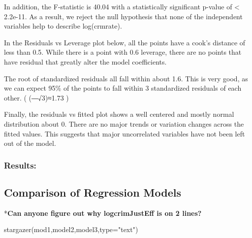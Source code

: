 \documentclass[]{article}
\newenvironment{Shaded}{}{}
\newcommand{\DataTypeTok}[1]{#1}
\newcommand{\KeywordTok}[1]{\textcolor[rgb]{0.00,0.00,1.00}{#1}}
\newcommand{\NormalTok}[1]{#1}
\newcommand{\StringTok}[1]{\textcolor[rgb]{0.00,0.50,0.50}{#1}}
\begin{document}
In addition, the F-statistic is 40.04 with a statistically significant
p-value of \textless{} 2.2e-11. As a result, we reject the null
hypothesis that none of the independent variables help to describe
log(crmrate).

In the Residuals vs Leverage plot below, all the points have a cook's
distance of less than 0.5. While there is a point with 0.6 leverage,
there are no points that have residual that greatly alter the model
coefficients.

The root of standardized residuals all fall within about 1.6. This is
very good, as we can expect 95\% of the points to fall within 3
standardized residuals of each other. ( (⎯⎯√3)≈1.73 )

Finally, the residuals vs fitted plot shows a well centered and mostly
normal distribution about 0. There are no major trends or variation
changes across the fitted values. This suggests that major uncorrelated
variables have not been left out of the model.

\hypertarget{results}{%
\subsubsection{Results:}\label{results}}

\hypertarget{comparison-of-regression-models}{%
\subsection{Comparison of Regression
Models}\label{comparison-of-regression-models}}

*\textbf{Can anyone figure out why logcrimJustEff is on 2 lines?}

\begin{Shaded}
\begin{Highlighting}[]
\KeywordTok{stargazer}\NormalTok{(mod1,model2,model3,}\DataTypeTok{type=}\StringTok{"text"}\NormalTok{)}
\end{Highlighting}
\end{Shaded}
\end{document}

